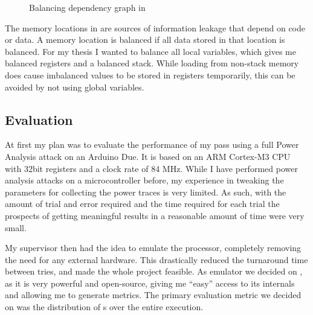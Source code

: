\begin{figure}[h]
  \caption{Balancing dependency graph in \llvm{}}
  \label{fig:balancing}
\end{figure}

The memory locations in  are sources of information leakage that depend on code or data.
A memory location is balanced if all data stored in that location is balanced.
For my thesis I wanted to balance all local variables, which gives me balanced registers and a balanced stack.
While loading from non-stack memory does cause imbalanced values to be stored in registers temporarily, this can be avoided by not using global variables.

\subsection{Evaluation}
At first my plan was to evaluate the performance of my pass using a full Power Analysis attack on an Arduino Due\cite{arduino}.
It is based on an ARM Cortex-M3 CPU with 32bit registers and a clock rate of 84 MHz.
While I have performed power analysis attacks on a microcontroller before, my experience in tweaking the parameters for collecting the power traces is very limited.
As such, with the amount of trial and error required and the time required for each trial the prospects of getting meaningful results in a reasonable amount of time were very small.

My supervisor then had the idea to emulate the processor, completely removing the need for any external hardware.
This drastically reduced the turnaround time between tries, and made the whole project feasible.
As emulator we decided on \qemu{}, as it is very powerful and open-source, giving me ``easy'' access to its internals and allowing me to generate metrics.
The primary evaluation metric we decided on was the distribution of \hammingw{}s over the entire execution.
